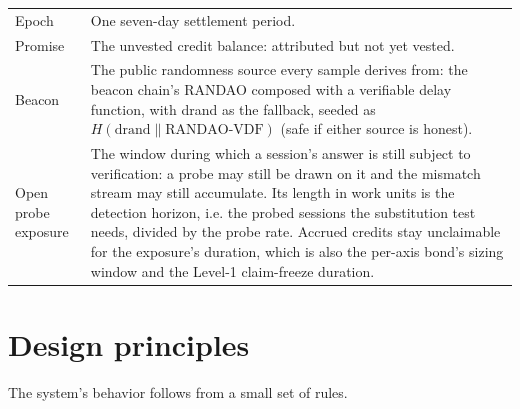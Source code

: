 \documentclass[11pt]{article}
\begin{document}
\begin{center}
\begin{tabular}{@{}p{3.2cm}p{11.0cm}@{}}
        Epoch                   & One seven-day settlement period.                        \\
        Promise                 & The unvested credit balance: attributed but not yet
        vested.                                                                           \\
        Beacon                  & The public randomness source every sample derives from:
        the beacon chain's RANDAO composed with a verifiable delay
        function, with drand as the fallback, seeded as
        $H(\text{drand} \parallel \text{RANDAO-VDF})$ (safe if either
        source is honest).                                                                \\
        Open probe exposure     & The window during which a session's answer is
        still subject to verification: a probe may still be drawn on it and
        the mismatch stream may still accumulate. Its length in work units
        is the detection horizon, i.e. the probed sessions the substitution
        test needs, divided by the probe rate. Accrued credits stay
        unclaimable for the exposure's duration, which is also the per-axis
        bond's sizing window and the Level-1 claim-freeze duration.                       \\
        \bottomrule
    \end{tabular}
\end{center}

\section{Design principles}

The system's behavior follows from a small set of rules.
\end{document}
